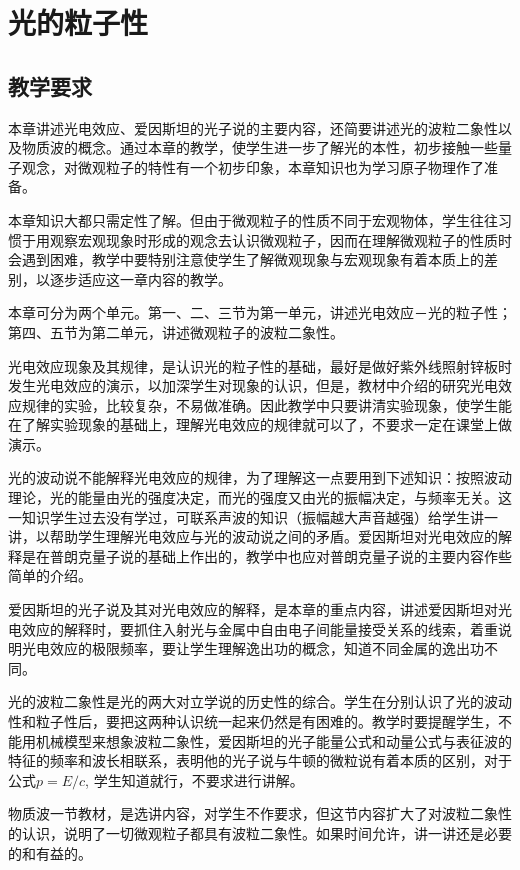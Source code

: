 \chapter{光的粒子性}\minitoc[n]
\section{教学要求}

本章讲述光电效应、爱因斯坦的光子说的主要内容，还简要讲述光的波粒二象性以及物质波的概念。通过本章的教学，使学生进一步了解光的本性，初步接触一些量子观念，对微观粒子的特性有一个初步印象，本章知识也为学习原子物理作了准备。

本章知识大都只需定性了解。但由于微观粒子的性质不同于宏观物体，学生往往习惯于用观察宏观现象时形成的观念去认识微观粒子，因而在理解微观粒子的性质时会遇到困难，教学中要特别注意使学生了解微观现象与宏观现象有着本质上的差别，以逐步适应这一章内容的教学。

本章可分为两个单元。第一、二、三节为第一单元，讲述光电效应－光的粒子性；第四、五节为第二单元，讲述微观粒子的波粒二象性。

光电效应现象及其规律，是认识光的粒子性的基础，最好是做好紫外线照射锌板时发生光电效应的演示，以加深学生对现象的认识，但是，教材中介绍的研究光电效应规律的实验，比较复杂，不易做准确。因此教学中只要讲清实验现象，使学生能在了解实验现象的基础上，理解光电效应的规律就可以了，不要求一定在课堂上做演示。

光的波动说不能解释光电效应的规律，为了理解这一点要用到下述知识：按照波动理论，光的能量由光的强度决定，而光的强度又由光的振幅决定，与频率无关。这一知识学生过去没有学过，可联系声波的知识（振幅越大声音越强）给学生讲一讲，以帮助学生理解光电效应与光的波动说之间的矛盾。爱因斯坦对光电效应的解释是在普朗克量子说的基础上作出的，教学中也应对普朗克量子说的主要内容作些简单的介绍。

爱因斯坦的光子说及其对光电效应的解释，是本章的重点内容，讲述爱因斯坦对光电效应的解释时，要抓住入射光与金属中自由电子间能量接受关系的线索，着重说明光电效应的极限频率，要让学生理解逸出功的概念，知道不同金属的逸出功不同。

光的波粒二象性是光的两大对立学说的历史性的综合。学生在分别认识了光的波动性和粒子性后，要把这两种认识统一起来仍然是有困难的。教学时要提醒学生，不能用机械模型来想象波粒二象性，爱因斯坦的光子能量公式和动量公式与表征波的特征的频率和波长相联系，表明他的光子说与牛顿的微粒说有着本质的区别，对于公式$p=E/c$, 学生知道就行，不要求进行讲解。

物质波一节教材，是选讲内容，对学生不作要求，但这节内容扩大了对波粒二象性的认识，说明了一切微观粒子都具有波粒二象性。如果时间允许，讲一讲还是必要的和有益的。

